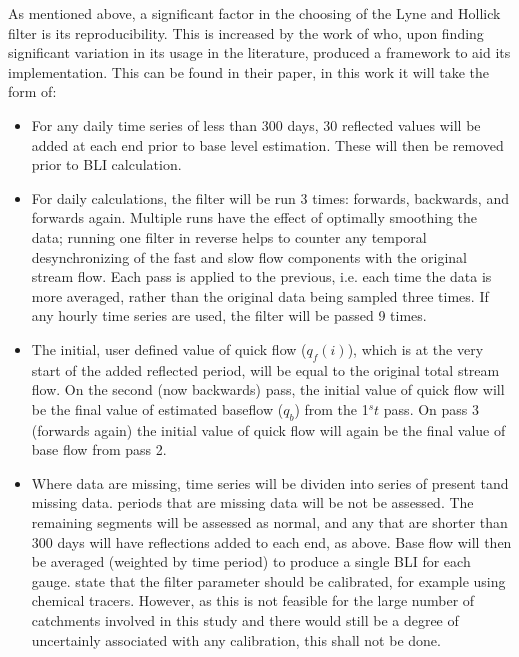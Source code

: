 \documentclass[DIV=calc, paper=a4, fontsize=11pt, twocolumn]{scrartcl}	 %
\begin{document}
As mentioned above, a significant factor in the choosing of the Lyne and Hollick filter is its reproducibility. This is increased by the work of \citet{Ladson2013} who, upon finding significant variation in its usage in the literature, produced a framework to aid its implementation. This can be found in their paper, in this work it will take the form of:
\begin{itemize}
	\item For any daily time series of less than 300 days, 30 reflected values will be added at each end prior to base level estimation. These will then be removed prior to BLI calculation.
	\item For daily calculations, the filter will be run 3 times: forwards, backwards, and forwards again. Multiple runs have the effect of optimally smoothing the data; running one filter in reverse helps to counter any temporal desynchronizing of the fast and slow flow components with the original stream flow. Each pass is applied to the previous, i.e. each time the data is more averaged, rather than the original data being sampled three times.
	If any hourly time series are used, the filter will be passed 9 times.
	\item The initial, user defined value of quick flow ($q_f(i)$), which is at the very start of the added reflected period, will be equal to the original total stream flow. On the second (now backwards) pass, the initial value of quick flow will be the final value of estimated baseflow ($q_b$) from the 1$^st$ pass. On pass 3 (forwards again) the initial value of quick flow will again be the final value of base flow from pass 2.
	\item Where data are missing, time series will be dividen into series of present tand missing data. periods that are missing data will be not be assessed. The remaining segments will be assessed as normal, and any that are shorter than 300 days will have reflections added to each end, as above. Base flow will then be averaged (weighted by time period) to produce a single BLI for each gauge.
	\citet{Ladson2013} state that the filter parameter should be calibrated, for example using chemical tracers. However, as this is not feasible for the large number of catchments involved in this study and there would still be a degree of uncertainly associated with any calibration, this shall not be done.
	
\end{itemize}
\end{document}
